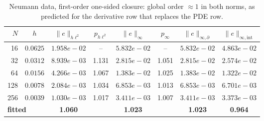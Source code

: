\begin{table}[H]
\centering\small
\caption{Neumann data, first-order one-sided closure: global order $\approx 1$ in both norms, as predicted for the derivative row that replaces the PDE row.}
\label{tab:conv-onesided-neu}
\begin{tabular}{rccccccc}
\toprule
$N$ & $h$ & $\lVert e\rVert_{h\ell^2}$ & $p_{h\ell^2}$ & $\lVert e\rVert_{\infty}$ & $p_{\infty}$ & $\lVert e\rVert_{\infty,\partial}$ & $\lVert e\rVert_{\infty,\mathrm{int}}$ \\
\midrule
16 & $0.0625$ & $1.958e-02$ & -- & $5.832e-02$ & -- & $5.832e-02$ & $4.863e-02$ \\
32 & $0.0312$ & $8.939e-03$ & 1.131 & $2.815e-02$ & 1.051 & $2.815e-02$ & $2.574e-02$ \\
64 & $0.0156$ & $4.266e-03$ & 1.067 & $1.383e-02$ & 1.025 & $1.383e-02$ & $1.322e-02$ \\
128 & $0.0078$ & $2.084e-03$ & 1.034 & $6.853e-03$ & 1.013 & $6.853e-03$ & $6.701e-03$ \\
256 & $0.0039$ & $1.030e-03$ & 1.017 & $3.411e-03$ & 1.007 & $3.411e-03$ & $3.373e-03$ \\
\midrule
\multicolumn{2}{l}{\textbf{fitted}} & \textbf{1.060} & & \textbf{1.023} & & \textbf{1.023} & \textbf{0.964} \\
\bottomrule
\end{tabular}
\end{table}